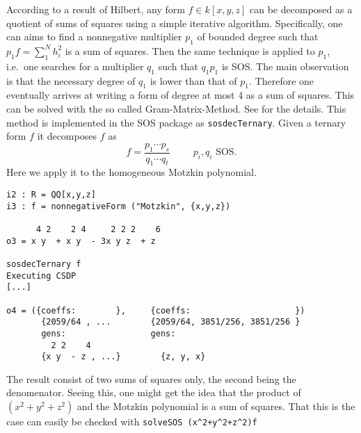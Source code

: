 \documentclass[11pt]{amsart}
\theoremstyle{plain}%
\theoremstyle{definition}
\theoremstyle{remark}
\newcommand{\SOS}{\textsc{SOS}\xspace}
\begin{document}
According to a result of Hilbert, any form $f\in k[x,y,z]$ can be decomposed as a quotient of sums of squares using a simple iterative algorithm.
Specifically, one can aims to find a nonnegative multiplier $p_{1}$ of bounded degree such that $p_{1}f = \sum_{1}^{N}h_{i}^{2}$ is a sum of squares.
Then the same technique is applied to $p_{1}$, i.e.~one searches for a multiplier $q_{1}$ such that $q_{1}p_{1}$ is SOS.
The main observation is that the necessary degree of $q_{1}$ is lower than that of $p_{1}$.
Therefore one eventually arrives at writing a form of degree at most 4 as a sum of squares.
This can be solved with the so called Gram-Matrix-Method.
See \cite{de2004products} for the details.
This method is implemented in the \SOS package as \verb|sosdecTernary|.  Given a ternary form $f$ it decomposes $f$ as
\[
  f = \frac{p_{1}\cdots p_{s}}{q_{1}\cdots q_{t}} \qquad \text {
    $p_{i},q_{i}$ SOS}.
\]
Here we apply it to the homogeneous Motzkin polynomial.
{\small
\begin{verbatim}
i2 : R = QQ[x,y,z]
i3 : f = nonnegativeForm ("Motzkin", {x,y,z})

      4 2    2 4     2 2 2    6
o3 = x y  + x y  - 3x y z  + z

sosdecTernary f
Executing CSDP
[...]

o4 = ({coeffs:        },     {coeffs:                     })
       {2059/64 , ...        {2059/64, 3851/256, 3851/256 }
       gens:                 gens:
         2 2    4              
       {x y  - z , ...}        {z, y, x}
\end{verbatim}
}
The result consist of two sums of squares only, the second being the denomenator.
Seeing this, one might get the idea that the product of $(x^{2}+y^{2}+z^{2})$ and the Motzkin polynomial is a sum of squares.
That this is the case can easily be checked with \verb|solveSOS (x^2+y^2+z^2)f|


\end{document}
